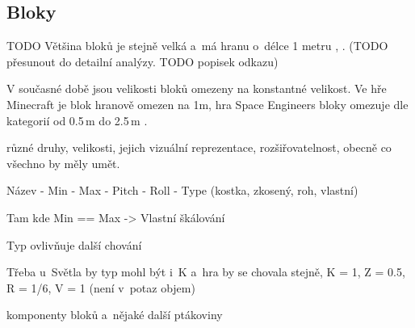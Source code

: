 
\subsection{Bloky}

TODO  Většina bloků je stejně velká a~má hranu o~délce 1 metru \citep{mc_block}, \citep{mc_units}. (TODO přesunout do detailní analýzy. TODO popisek odkazu)

V současné době jsou velikosti bloků omezeny na konstantné velikost. Ve hře Minecraft je blok hranově omezen na 1m, hra Space Engineers bloky omezuje dle kategorií od 0.5\,\rm m do 2.5\,\rm m \citep{se_blocks_wiki}.


různé druhy, velikosti, jejich vizuální reprezentace, rozšiřovatelnost, obecně co všechno by měly umět.

Název - Min - Max - Pitch - Roll - Type (kostka, zkosený, roh, vlastní)

Tam kde Min == Max -> Vlastní škálování

Typ ovlivňuje další chování

Třeba u~Světla by typ mohl být i~K a~hra by se chovala stejně, K = 1, Z = 0.5, R = 1/6, V = 1 (není v~potaz objem)

komponenty bloků a~nějaké další ptákoviny

